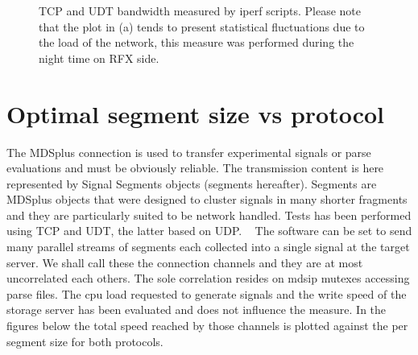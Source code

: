 \documentclass[10pt,a4paper]{article}
\begin{document}
\begin{figure}[htbp!]
\centerline{
}
\caption[]
{ TCP and UDT bandwidth measured by iperf scripts. Please note that the plot in (a) tends to present statistical fluctuations due to the load of the network,
this measure was performed during the night time on RFX side. }
\label{fig:iprf}
\end{figure}


\section{ Optimal segment size vs protocol }

The MDSplus connection is used to transfer experimental signals or parse evaluations and must be obviously reliable.
The transmission content is here represented by Signal Segments objects (segments hereafter). 
Segments are MDSplus objects that were designed to cluster signals in many shorter fragments and they are particularly suited to be network handled.
Tests has been performed using TCP and UDT, the latter based on UDP. 
~
The software can be set to send many parallel streams of segments each collected into a single signal at the target server.
We shall call these the connection channels and they are at most uncorrelated each others. The sole correlation resides on mdsip mutexes accessing parse files.
The cpu load requested to generate signals and the write speed of the storage server has been evaluated and does not influence the measure.
In the figures below the total speed reached by those channels is plotted against the per segment size for both protocols.
\end{document}
